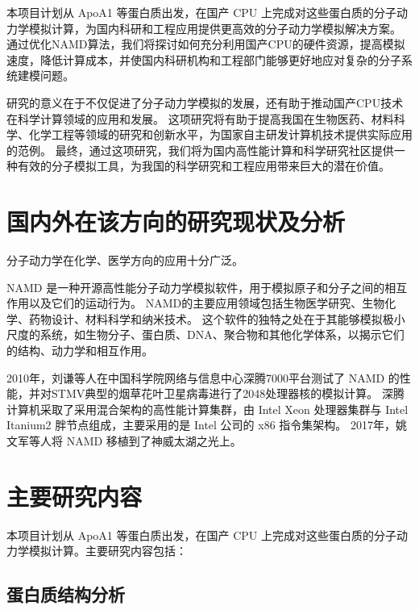 本项目计划从 ApoA1 等蛋白质出发，在国产 CPU 上完成对这些蛋白质的分子动力学模拟计算，为国内科研和工程应用提供更高效的分子动力学模拟解决方案。
通过优化NAMD算法，我们将探讨如何充分利用国产CPU的硬件资源，提高模拟速度，降低计算成本，并使国内科研机构和工程部门能够更好地应对复杂的分子系统建模问题。

研究的意义在于不仅促进了分子动力学模拟的发展，还有助于推动国产CPU技术在科学计算领域的应用和发展。
这项研究将有助于提高我国在生物医药、材料科学、化学工程等领域的研究和创新水平，为国家自主研发计算机技术提供实际应用的范例。
最终，通过这项研究，我们将为国内高性能计算和科学研究社区提供一种有效的分子模拟工具，为我国的科学研究和工程应用带来巨大的潜在价值。

\section{国内外在该方向的研究现状及分析}

分子动力学在化学、医学方向的应用十分广泛。


NAMD 是一种开源高性能分子动力学模拟软件，用于模拟原子和分子之间的相互作用以及它们的运动行为。
NAMD的主要应用领域包括生物医学研究\cite{yao2020molecular}、生物化学\cite{knott2020characterization}、药物设计\cite{han2020computational}、材料科学和纳米技术。
这个软件的独特之处在于其能够模拟极小尺度的系统，如生物分子、蛋白质、DNA、聚合物和其他化学体系，以揭示它们的结构、动力学和相互作用。


2010年，刘谦等人在中国科学院网络与信息中心深腾7000平台测试了 NAMD 的性能，并对STMV典型的烟草花叶卫星病毒进行了2048处理器核的模拟计算\cite{刘倩2010基于深腾}。
深腾计算机采取了采用混合架构的高性能计算集群，由 Intel Xeon 处理器集群与 Intel Itanium2 胖节点组成，主要采用的是 Intel 公司的 x86 指令集架构。
2017年，姚文军\cite{姚文军2017基于神威太湖之光的}等人将 NAMD 移植到了神威太湖之光上。

\section{主要研究内容}

本项目计划从 ApoA1 等蛋白质出发，在国产 CPU 上完成对这些蛋白质的分子动力学模拟计算。主要研究内容包括：

\subsection{蛋白质结构分析}

